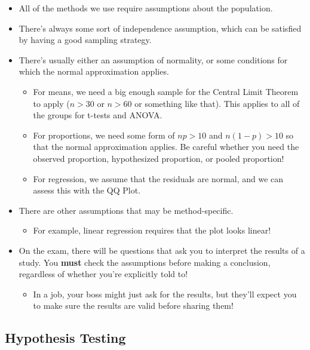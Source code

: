 \documentclass[
  letterpaper,
  DIV=11,
  numbers=noendperiod,
  oneside]{scrreprt}
\providecommand{\tightlist}{%
  \setlength{\itemsep}{0pt}\setlength{\parskip}{0pt}}\usepackage{longtable,booktabs,array}
\begin{document}
\begin{itemize}
\tightlist
\item
  All of the methods we use require assumptions about the population.
\item
  There's always some sort of independence assumption, which can be
  satisfied by having a good sampling strategy.
\item
  There's usually either an assumption of normality, or some conditions
  for which the normal approximation applies.

  \begin{itemize}
  \tightlist
  \item
    For means, we need a big enough sample for the Central Limit Theorem
    to apply (\(n > 30\) or \(n>60\) or something like that). This
    applies to all of the groups for t-tests and ANOVA.
  \item
    For proportions, we need some form of \(np>10\) and \(n(1-p)>10\) so
    that the normal approximation applies. Be careful whether you need
    the observed proportion, hypothesized proportion, or pooled
    proportion!
  \item
    For regression, we assume that the residuals are normal, and we can
    assess this with the QQ Plot.
  \end{itemize}
\item
  There are other assumptions that may be method-specific.

  \begin{itemize}
  \tightlist
  \item
    For example, linear regression requires that the plot looks linear!
  \end{itemize}
\item
  On the exam, there will be questions that ask you to interpret the
  results of a study. You \textbf{must} check the assumptions before
  making a conclusion, regardless of whether you're explicitly told to!

  \begin{itemize}
  \tightlist
  \item
    In a job, your boss might just ask for the results, but they'll
    expect you to make sure the results are valid before sharing them!
  \end{itemize}
\end{itemize}

\hypertarget{hypothesis-testing-1}{%
\subsection{Hypothesis Testing}\label{hypothesis-testing-1}}
\end{document}
